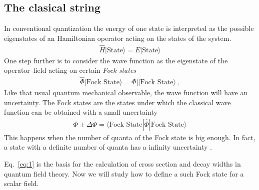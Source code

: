 \subsection{The clasical string}
\label{sec:clasical-string}

In conventional quantization the energy of one state is interpreted as the possible eigenstates of an Hamiltonian operator acting on the states of the system. 
\begin{align}
  \widehat{H}|\text{State}\rangle=E|\text{State}\rangle
\end{align}
One step further is to consider the wave function as the eigenstate  of the operator--field acting on certain \emph{Fock states}
\begin{align}
\label{eq:1}
  \widehat{\Phi}|\text{Fock State}\rangle=\Phi||\text{Fock State}\rangle\,,
\end{align}
Like that usual quantum mechanical observable, the wave function will have an uncertainty. 
The Fock states are the states under which the classical wave function can be obtained with a small uncertainty
\begin{align}
    \Phi\pm\Delta\Phi=\langle\text{Fock State}|\widehat{\Phi}|\text{Fock State}\rangle
\end{align}
This happens when the number of quanta of the Fock state is big enough. In fact, a state with a definite number of quanta has a infinity uncertainty \cite{Gross:1993}.

Eq.~\eqref{eq:1} is the basis for the calculation of cross section and decay widths in quantum field theory. Now we will study how to define a such Fock state for a scalar field.


